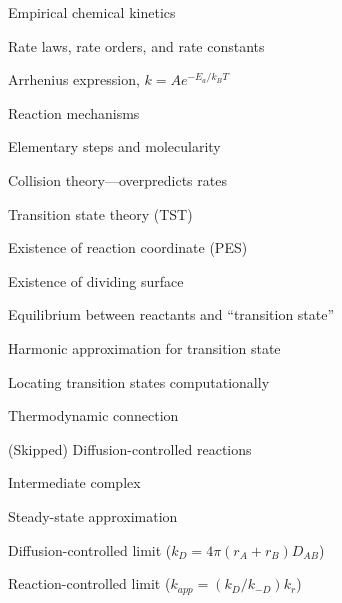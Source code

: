 \documentclass[11pt]{article}
\begin{document}
\begin{outline}
\begin{outline}
  \item Empirical chemical kinetics
    \begin{outline}
    \item Rate laws, rate orders, and rate constants
    \item Arrhenius expression, $k=A e^{-E_a/k_BT}$
    \end{outline}
  \item Reaction mechanisms
  \item Elementary steps and molecularity
  \item Collision theory---overpredicts rates
  \item Transition state theory (TST)
    \begin{outline}
    \item Existence of reaction coordinate (PES)
    \item Existence of dividing surface
    \item Equilibrium between reactants and ``transition state''
    \item Harmonic approximation for transition state
    \end{outline}
  \item Locating transition states computationally
  \item Thermodynamic connection 
  \item (Skipped) Diffusion-controlled reactions 
    \begin{outline}
      \item Intermediate complex
      \item Steady-state approximation
      \item Diffusion-controlled limit ($k_D = 4\pi (r_A + r_B) D_{AB}$)
      \item Reaction-controlled limit ($k_{app}=(k_D/k_{-D})k_r$)
    \end{outline}

  \end{outline}


\end{outline}
\end{document}
